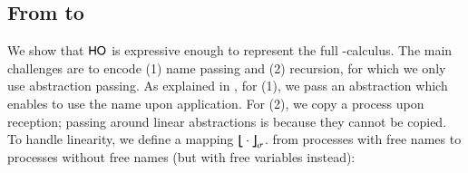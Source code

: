 \documentclass[runningheads]{llncs}
\begin{document}
{


\subsection{From \HOp to \HO}
\label{subsec:HOpi_to_HO}
\noi We show that $\mathsf{HO}$ is expressive enough to
represent the full
 \HOp-calculus.
The main challenges are to encode (1) name passing 
and (2) recursion, 
for which 
we only use  abstraction passing. 
 As explained in , for (1), we pass  
an %
abstraction which enables to use the name upon application. 
For (2), we 
copy a process upon reception; passing around linear abstractions
is  
because 
they cannot be copied.
To handle linearity, we define 
a mapping 
$\big\lfloor\!\!\big\lfloor\cdot\big\rfloor\!\!\big\rfloor^{}_\sigma$.
from processes with free names to processes without free
names (but with free variables instead):

}
\end{document}
